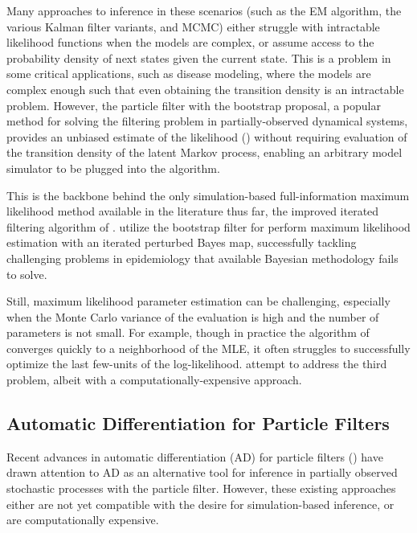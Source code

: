 \documentclass{article}
\begin{document}
Many approaches to inference in these scenarios (such as the EM algorithm, the various Kalman filter variants, and MCMC) either struggle with intractable likelihood functions when the models are complex, or assume access to the probability density of next states given the current state. This is a problem in some critical applications, such as disease modeling, where the models are complex enough such that even obtaining the transition density is an intractable problem. However, the particle filter with the bootstrap proposal, a popular method for solving the filtering problem in partially-observed dynamical systems, provides an unbiased estimate of the likelihood (\cite{delmoral2004feynman}) without requiring evaluation of the transition density of the latent Markov process, enabling an arbitrary model simulator to be plugged into the algorithm.

This is the backbone behind the only simulation-based full-information maximum likelihood method available in the literature thus far, the improved iterated filtering algorithm of \citet{ionides15}. \citet{ionides15} utilize the bootstrap filter for perform maximum likelihood estimation with an iterated perturbed Bayes map, successfully tackling challenging problems in epidemiology that available Bayesian methodology fails to solve. 

Still, maximum likelihood parameter estimation can be challenging, especially when the Monte Carlo variance of the evaluation is high and the number of parameters is not small. For example, though in practice the algorithm of \citet{ionides15} converges quickly to a neighborhood of the MLE, it often struggles to successfully optimize the last few-units of the log-likelihood. \citet{Ionides_mcap} attempt to address the third problem, albeit with a computationally-expensive approach. 

\subsection{Automatic Differentiation for Particle Filters}

Recent advances in automatic differentiation (AD) for particle filters (\cite{blei2018vsmc, jon2018diffpf, corenflos2021ot, scibior2021dpf, doucet2022particlebased}) have drawn attention to AD as an alternative tool for inference in partially observed stochastic processes with the particle filter. However, these existing approaches either are not yet compatible with the desire for simulation-based inference, or are computationally expensive. 
\end{document}
